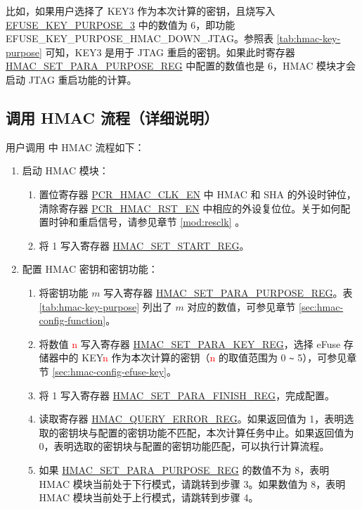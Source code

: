 \documentclass[main\_\_CN.tex]{subfiles}
\begin{document}
比如，如果用户选择了 KEY3 作为本次计算的密钥，且烧写入 \hyperref[fielddesc:EFUSEKEYPURPOSE3]{EFUSE\_KEY\_PURPOSE\_3} 中的数值为 6，即功能 EFUSE\_KEY\_PURPOSE\_HMAC\_DOWN\_JTAG。参照表 \ref{tab:hmac-key-purpose} 可知，KEY3 是用于 JTAG 重启的密钥。如果此时寄存器 \hyperref[regdesc:HMACSETPARAPURPOSEREG]{HMAC\_SET\_PARA\_PURPOSE\_REG} 中配置的数值也是 6，HMAC 模块才会启动 JTAG 重启功能的计算。


\subsection{调用 HMAC 流程（详细说明）}
\label{sec:hmac-process-detailed}
用户调用 \chipname{} 中 HMAC 流程如下：

\begin{enumerate}
    \item 启动 HMAC 模块：
    \begin{enumerate}
        \item 置位寄存器 \hyperref[fielddesc:PCRHMACCLKEN]{PCR\_HMAC\_CLK\_EN} 中 HMAC 和 SHA 的外设时钟位，清除寄存器 \hyperref[fielddesc:PCRHMACRSTEN]{PCR\_HMAC\_RST\_EN} 中相应的外设复位位。关于如何配置时钟和重启信号，请参见章节 \ref{mod:resclk} \textit{}。
        \item 将 1 写入寄存器 \hyperref[regdesc:HMACSETSTARTREG]{HMAC\_SET\_START\_REG}。
    \end{enumerate}

    \item 配置 HMAC 密钥和密钥功能：
        \begin{enumerate}
            \item 将密钥功能 \begin{math}m\end{math} 写入寄存器 \hyperref[regdesc:HMACSETPARAPURPOSEREG]{HMAC\_SET\_PARA\_PURPOSE\_REG}。表 \ref{tab:hmac-key-purpose} 列出了 \begin{math}m\end{math} 对应的数值，可参见章节 \ref{sec:hmac-config-function}。
            \item 将数值 \textcolor{red}{n} 写入寄存器 \hyperref[regdesc:HMACSETPARAKEYREG]{HMAC\_SET\_PARA\_KEY\_REG}，选择 eFuse 存储器中的 KEY\textcolor{red}{n} 作为本次计算的密钥（\textcolor{red}{n} 的取值范围为 0 \verb+~+ 5），可参见章节 \ref{sec:hmac-config-efuse-key}。
            \item 将 1 写入寄存器 \hyperref[regdesc:HMACSETPARAFINISHREG]{HMAC\_SET\_PARA\_FINISH\_REG}，完成配置。
            \item 读取寄存器 \hyperref[regdesc:HMACQUERYERRORREG]{HMAC\_QUERY\_ERROR\_REG}。如果返回值为 1，表明选取的密钥块与配置的密钥功能不匹配，本次计算任务中止。如果返回值为 0，表明选取的密钥块与配置的密钥功能匹配，可以执行计算流程。
            \item 如果 \hyperref[regdesc:HMACSETPARAPURPOSEREG]{HMAC\_SET\_PARA\_PURPOSE\_REG} 的数值不为 8，表明 HMAC 模块当前处于下行模式，请跳转到步骤 3。如果数值为 8，表明 HMAC 模块当前处于上行模式，请跳转到步骤 4。
        \end{enumerate}


\end{enumerate}
\end{document}
